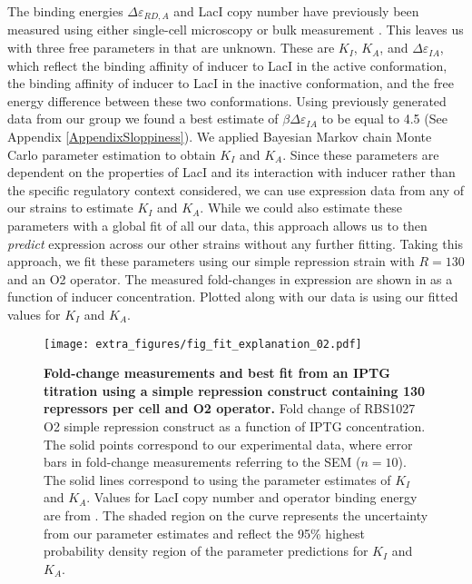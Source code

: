 The binding energies $\Delta \varepsilon_{RD,A}$ and LacI copy number have
previously been measured using either single-cell microscopy or bulk measurement \cite{Oehler1994,Vilar2003,Garcia2011, Brewster2014}. This leaves us with three free parameters in \eref[eq7] that are unknown. These are $K_I$, $K_A$, and $\Delta\varepsilon_{IA}$, which reflect the binding affinity of inducer to LacI in the active conformation, the binding affinity of inducer to LacI in the inactive conformation, and the free energy difference between these two conformations. Using previously generated data from our group we found a best estimate of $\beta\Delta\varepsilon_{IA}$ to be equal to 4.5 (See Appendix \ref{AppendixSloppiness}). We applied Bayesian Markov chain Monte Carlo parameter estimation to obtain $K_I$ and $K_A$. Since these parameters are dependent on the properties of LacI and its interaction with inducer rather than the specific regulatory context considered, we can use expression data from any of our strains to estimate $K_I$ and $K_A$. While we could also estimate these parameters with a global fit of all our data, this approach allows us to then \textit{predict} expression across our other strains without any further fitting. Taking this approach, we fit these parameters using our simple repression strain with $R=130$ and an O2 operator. The measured fold-changes in expression are shown in  as a function of inducer concentration. Plotted along with our data is \eref[eq7] using our fitted values for $K_I$ and $K_A$.

\begin{figure}[h]
	\centering \texttt{[image: extra\_figures/fig\_fit\_explanation\_02.pdf]}
	\caption{{\bf Fold-change measurements and best fit from an IPTG titration using a simple repression construct containing 130 repressors per cell and O2 operator.} Fold change of RBS1027 O2 simple repression construct as a function of IPTG concentration. The solid points correspond to our experimental data, where error bars in fold-change measurements referring to the SEM ($n=10$). The solid	lines correspond to \eref[eq7] using the parameter estimates of $K_I$ and $K_A$. Values for LacI copy number and operator binding energy are from \cite{Garcia2011}.  The shaded region on the curve represents the uncertainty from our parameter estimates and reflect the 95\% highest probability density region of the parameter predictions for $K_I$ and $K_A$. } \label{fig_result1}
\end{figure}

